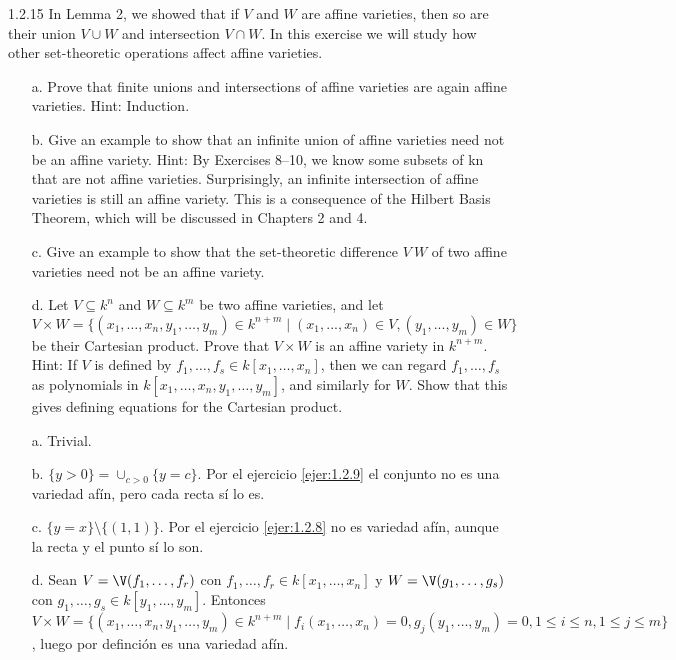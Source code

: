 \documentclass[twoside]{article}
\begin{document}
\begin{ejercicio}{1.2.15}
In Lemma 2, we showed that if $V$ and $W$ are affine varieties, then so are their union $V∪W$
and intersection $V ∩W$. In this exercise we will study how other set-theoretic operations
affect affine varieties.
\begin{itemize}
\item[a.] Prove that finite unions and intersections of affine varieties are again affine varieties.
Hint: Induction.
\item[b.] Give an example to show that an infinite union of affine varieties need not be an
affine variety. Hint: By Exercises 8–10, we know some subsets of kn that are not
affine varieties. Surprisingly, an infinite intersection of affine varieties is still an affine
variety. This is a consequence of the Hilbert Basis Theorem, which will be discussed
in Chapters 2 and 4.
\item[c.] Give an example to show that the set-theoretic difference $V \ W$ of two affine varieties
need not be an affine variety.
\item[d.] Let $V ⊆ k^n$ and $W ⊆ k^m$ be two affine varieties, and let
$$V × W = \{(x_1,\dots , x_n, y_1,\dots , y_m) ∈ k^{n+m} \mid  (x_1, . . . , x_n) ∈ V, (y_1, . . . , y_m) ∈ W\}$$
be their Cartesian product. Prove that $V ×W$ is an affine variety in $k^{n+m}$. Hint: If $V$ is
defined by $f_1,\dots , f_s ∈ k[x_1,\dots , x_n]$, then we can regard $f_1,\dots, f_s$ as polynomials in
$k[x_1,\dots , x_n, y_1,\dots, y_m]$, and similarly for $W$. Show that this gives defining equations
for the Cartesian product.
\end{itemize}
\end{ejercicio}
\begin{solucion}
\begin{itemize}
\item[a.] Trivial.
\item[b.] $\{y>0\}=\cup_{c>0}\{y=c\}$. Por el ejercicio \ref{ejer:1.2.9} el conjunto no es una variedad afín, pero cada recta sí lo es. 
\item[c.] $\{y=x\}\setminus \{(1,1)\}$. Por el ejercicio \ref{ejer:1.2.8} no es variedad afín, aunque la recta y el punto sí lo son.
\item[d.] Sean $V=\V(f_1,\dots, f_r)$ con $f_1,\dots, f_r\in k[x_1,\dots, x_n]$ y $W=\V(g_1,\dots, g_s)$ con $g_1,\dots, g_s\in k[y_1,\dots, y_m]$. Entonces $V\times W=\{(x_1,\dots, x_n,y_1,\dots, y_m)\in k^{n+m}\mid f_i(x_1,\dots, x_n)=0, g_j(y_1,\dots, y_m)=0, 1\leq i\leq n, 1\leq j\leq m\}$, luego por definción es una variedad afín.
\end{itemize}
\end{solucion}
\end{document}
